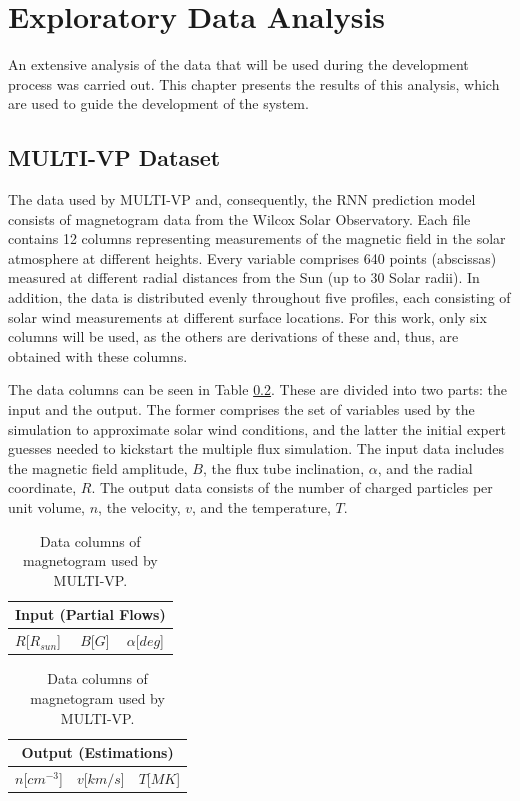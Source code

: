 \chapter*{Exploratory Data Analysis}\label{chap:eda}
An extensive analysis of the data that will be used during the development process was carried out. This chapter presents the results of this analysis, which are used to guide the development of the system.


\section{MULTI-VP Dataset}\label{sec:data_prelim_analysis}
The data used by MULTI-VP and, consequently, the RNN prediction model consists of magnetogram data from the Wilcox Solar Observatory. Each file contains 12 columns representing measurements of the magnetic field in the solar atmosphere at different heights. Every variable comprises 640 points (abscissas) measured at different radial distances from the Sun (up to 30 Solar radii). In addition, the data is distributed evenly throughout five profiles, each consisting of solar wind measurements at different surface locations. For this work, only six columns will be used, as the others are derivations of these and, thus, are obtained with these columns. 

The data columns can be seen in Table \ref{tab:multivp_columns}. These are divided into two parts: the input and the output. The former comprises the set of variables used by the simulation to approximate solar wind conditions, and the latter the initial expert guesses needed to kickstart the multiple flux simulation. The input data includes the magnetic field amplitude, $B$, the flux tube inclination, $\alpha$, and the radial coordinate, $R$. The output data consists of the number of charged particles per unit volume, $n$, the velocity, $v$, and the temperature, $T$.

\begin{table}[ht]
    \caption{Data columns of magnetogram used by MULTI-VP.}
    \label{tab:multivp_columns}
    \begin{subtable}[h]{0.32\textwidth}
        \centering
        \begin{tabular}{lcc}
        \hline
        \multicolumn{3}{c}{Input (Partial Flows)}                              \\ \hline
        $R${[}$R_{sun}${]} & $B${[}$G${]} & $\alpha${[}$deg${]} \\ \hline
        \end{tabular}
    \end{subtable}
    \begin{subtable}[h]{0.32\textwidth}
        \centering
        \begin{tabular}{ccc}
        \hline
        \multicolumn{3}{c}{Output (Estimations)}                           \\ \hline
        $n${[}$cm^{-3}${]} & $v${[}$km/s${]} & $T${[}$MK${]} \\ \hline
        \end{tabular}
    \end{subtable}
\end{table}

